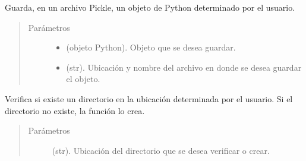 \documentclass[letterpaper,10pt,openany,spanish]{sphinxmanual}
\begin{document}
\begin{fulllineitems}
\label{\detokenize{funciones/utils:utils.auxiliares.guardar_objeto}}
Guarda, en un archivo Pickle, un objeto de Python determinado por el usuario.
\begin{quote}\begin{description}
\item[{Parámetros}] \leavevmode\begin{itemize}
\item {} 
 \textendash{} (objeto Python). Objeto que se desea guardar.

\item {} 
 \textendash{} (str). Ubicación y nombre del archivo en donde se desea guardar         el objeto.

\end{itemize}

\end{description}\end{quote}

\end{fulllineitems}


\begin{fulllineitems}
\label{\detokenize{funciones/utils:utils.auxiliares.verificar_crear_dir}}
Verifica si existe un directorio en la ubicación determinada por         el usuario. Si el directorio no existe, la función lo crea.
\begin{quote}\begin{description}
\item[{Parámetros}] \leavevmode
{} \textendash{} (str). Ubicación del directorio que se desea         verificar o crear.

\end{description}\end{quote}

\end{fulllineitems}
\end{document}
